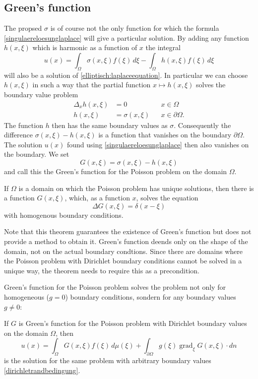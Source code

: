 \subsection{Green's function}
The propsed $\sigma$ is of course not the only function for which
the formula \eqref{singulaereloesunglaplace} will give a particular solution.
By adding any function $h(x,\xi)$ which is harmonic as a function of $x$
the integral
\[
u(x)=\int_{\Omega}\sigma(x,\xi)f(\xi)\,d\xi-\int_{\Omega}h(x,\xi)f(\xi)\,d\xi
\]
will also be a solution of
\eqref{elliptisch:laplaceequation}.
In particular we can choose $h(x,\xi)$ in such a way that
the partial function
$x\mapsto h(x,\xi)$
solves the boundary value problem
\[
\begin{aligned}
\Delta_x h(x,\xi)&=0&&x\in\Omega\\
h(x,\xi)&=\sigma(x,\xi)&&x\in\partial\Omega.
\end{aligned}
\]
The function $h$ then has the same boundary values as $\sigma$.
Consequently the difference $\sigma(x,\xi)-h(x,\xi)$ is a function
that vanishes on the boundary $\partial\Omega$.
The solution $u(x)$ found using \eqref{singulaereloesunglaplace}
then also vanishes on the boundary.
We set
\[
G(x,\xi)=\sigma(x,\xi)-h(x,\xi)
\]
and call this the Green's function for the Poisson problem on the
domain $\Omega$.

\begin{satz}If $\Omega$ is a domain on which the Poisson problem
has unique solutions, then there is a function $G(x,\xi)$,
which, as a function $x$, solves the equation
\[
\Delta G(x,\xi)=\delta(x-\xi)
\]
with homogenous boundary conditions.
\end{satz}

Note that this theorem guarantees the existence of Green's function 
but does not provide a method to obtain it.
Green's function deends only on the shape of the domain, not on
the actual boundary condtions.
Since there are domains where the Poisson problem with Dirichlet
boundary conditions cannot be solved in a unique way, the theorem
needs to require this as a precondition.

Green's function for the Poisson problem solves the problem
not only for homogeneous ($g=0$) boundary conditions, sondern
for any boundary values $g\ne 0$:

\begin{satz}
\label{dirichletloesung}
If $G$ is Green's function for the Poisson problem with Dirichlet
boundary values on the domain $\Omega$, then
\[
u(x)
=
\int_{\Omega}G(x,\xi)f(\xi)\,d\mu(\xi)
+
\int_{\partial\Omega}g(\xi)\operatorname{grad}_\xi G(x,\xi)\cdot dn
\]
is the solution for the same problem with arbitrary boundary values
\eqref{dirichletrandbedingung}.
\end{satz}

